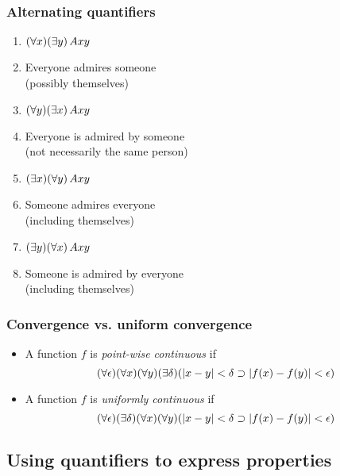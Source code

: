 \begin{frame}
    \frametitle{Alternating quantifiers}

\begin{enumerate}[<+->]
  \item $(\forall x) (\exists y) \, Axy$
  \item<2->[] Everyone admires someone\\
    (possibly themselves)
  \item $(\forall y) (\exists x) \, Axy$
  \item<3->[] Everyone is admired by someone\\
  (not necessarily the same person)
  \item $(\exists x) (\forall y) \, Axy$
  \item<4->[] Someone admires everyone\\
  (including themselves)
  \item $(\exists y) (\forall x) \, Axy$
  \item<5->[] Someone is admired by everyone\\
    (including themselves)
\end{enumerate}

\end{frame}

\begin{frame}
    \frametitle{Convergence vs. uniform convergence}

\begin{itemize}[<+->]
\item A function $f$ is \emph{point-wise continuous} if
\[
(\forall \epsilon)(\forall x)(\forall y)(\exists \delta)(\left|x - y\right| < \delta \supset \left|f(x) - f(y)\right| < \epsilon)
\]
\item A function $f$ is \emph{uniformly continuous} if
\[
(\forall \epsilon) (\exists \delta) (\forall x)(\forall y)(\left|x - y\right| < \delta \supset \left|f(x) - f(y)\right| < \epsilon)
\]
\end{itemize}

\end{frame}

\subsection{Using quantifiers to express properties}

